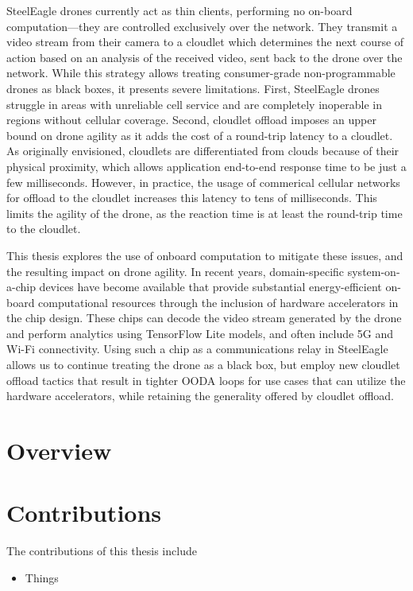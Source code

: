 SteelEagle drones currently act as thin clients, performing no on-board
computation---they are controlled exclusively over the network. They transmit a
video stream from their camera to a cloudlet which determines the next course
of action based on an analysis of the received video, sent back to the drone
over the network. While this strategy allows treating consumer-grade
non-programmable drones as black boxes, it presents severe limitations. First,
SteelEagle drones struggle in areas with unreliable cell service and are
completely inoperable in regions without cellular coverage. Second, cloudlet
offload imposes an upper bound on drone agility as it adds the cost of a
round-trip latency to a cloudlet. As originally envisioned, cloudlets are
differentiated from clouds because of their physical proximity, which allows
application end-to-end response time to be just a few milliseconds. However, in
practice, the usage of commerical cellular networks for offload to the cloudlet
increases this latency to tens of milliseconds. This limits the agility of the
drone, as the reaction time is at least the round-trip time to the cloudlet.

This thesis explores the use of onboard computation to mitigate these issues,
and the resulting impact on drone agility. In recent years, domain-specific
system-on-a-chip devices have become available that provide substantial
energy-efficient on-board computational resources through the inclusion of
hardware accelerators in the chip design. These chips can decode the video
stream generated by the drone and perform analytics using TensorFlow Lite
models, and often include 5G and Wi-Fi connectivity. Using such a chip as a
communications relay in SteelEagle allows us to continue treating the drone as
a black box, but employ new cloudlet offload tactics that result in tighter
OODA loops for use cases that can utilize the hardware accelerators, while
retaining the generality offered by cloudlet offload.



\section{Overview}


\section{Contributions}

The contributions of this thesis include
\begin{itemize}
  \item Things
\end{itemize}



